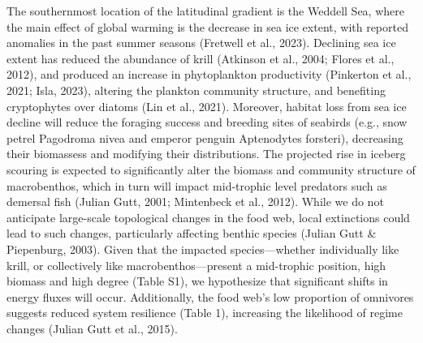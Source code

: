 \documentclass[
]{article}
\begin{document}
The southernmost location of the latitudinal gradient is the Weddell
Sea, where the main effect of global warming is the decrease in sea ice
extent, with reported anomalies in the past summer seasons (Fretwell et
al., 2023). Declining sea ice extent has reduced the abundance of krill
(Atkinson et al., 2004; Flores et al., 2012), and produced an increase
in phytoplankton productivity (Pinkerton et al., 2021; Isla, 2023),
altering the plankton community structure, and benefiting cryptophytes
over diatoms (Lin et al., 2021). Moreover, habitat loss from sea ice
decline will reduce the foraging success and breeding sites of seabirds
(e.g., snow petrel Pagodroma nivea and emperor penguin Aptenodytes
forsteri), decreasing their biomassess and modifying their
distributions. The projected rise in iceberg scouring is expected to
significantly alter the biomass and community structure of macrobenthos,
which in turn will impact mid-trophic level predators such as demersal
fish (Julian Gutt, 2001; Mintenbeck et al., 2012). While we do not
anticipate large-scale topological changes in the food web, local
extinctions could lead to such changes, particularly affecting benthic
species (Julian Gutt \& Piepenburg, 2003). Given that the impacted
species---whether individually like krill, or collectively like
macrobenthos---present a mid-trophic position, high biomass and high
degree (Table S1), we hypothesize that significant shifts in energy
fluxes will occur. Additionally, the food web's low proportion of
omnivores suggests reduced system resilience (Table 1), increasing the
likelihood of regime changes (Julian Gutt et al., 2015).
\end{document}
